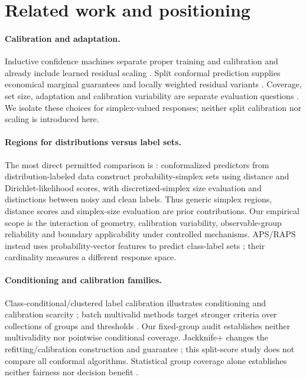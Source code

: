 \section{Related work and positioning}
\paragraph{Calibration and adaptation.}
Inductive confidence machines separate proper training and calibration and already include learned residual scaling \citep{papadopoulos2002inductive}. Split conformal prediction supplies economical marginal guarantees and locally weighted residual variants \citep{lei2016distribution}. Coverage, set size, adaptation and calibration variability are separate evaluation questions \citep{angelopoulos2021gentle}. We isolate these choices for simplex-valued responses; neither split calibration nor scaling is introduced here.

\paragraph{Regions for distributions versus label sets.}
The most direct permitted comparison is \citet{javanmardi2024credal}: conformalized predictors from distribution-labeled data construct probability-simplex sets using distance and Dirichlet-likelihood scores, with discretized-simplex size evaluation and distinctions between noisy and clean labels. Thus generic simplex regions, distance scores and simplex-size evaluation are prior contributions. Our empirical scope is the interaction of geometry, calibration variability, observable-group reliability and boundary applicability under controlled mechanisms. APS/RAPS instead uses probability-vector features to predict class-label sets \citep{angelopoulos2020raps}; their cardinality measures a different response space.

\paragraph{Conditioning and calibration families.}
Class-conditional/clustered label calibration illustrates conditioning and calibration scarcity \citep{ding2023classconditional}; batch multivalid methods target stronger criteria over collections of groups and thresholds \citep{jung2022multivalid}. Our fixed-group audit establishes neither multivalidity nor pointwise conditional coverage. Jackknife+ changes the refitting/calibration construction and guarantee \citep{barber2019jackknife}; this split-score study does not compare all conformal algorithms. Statistical group coverage alone establishes neither fairness nor decision benefit \citep{cresswell2024disparate}.

